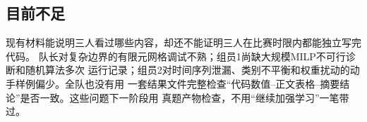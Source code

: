 \subsection{目前不足}

现有材料能说明三人看过哪些内容，却还不能证明三人在比赛时限内都能独立写完代码。
队长对复杂边界的有限元网格调试不熟；组员1尚缺大规模MILP不可行诊断和随机算法多次
运行记录；组员2对时间序列泄漏、类别不平衡和权重扰动的动手样例偏少。全队也没有用
一套结果文件完整检查“代码数值--正文表格--摘要结论”是否一致。这些问题下一阶段用
真题产物检查，不用“继续加强学习”一笔带过。

